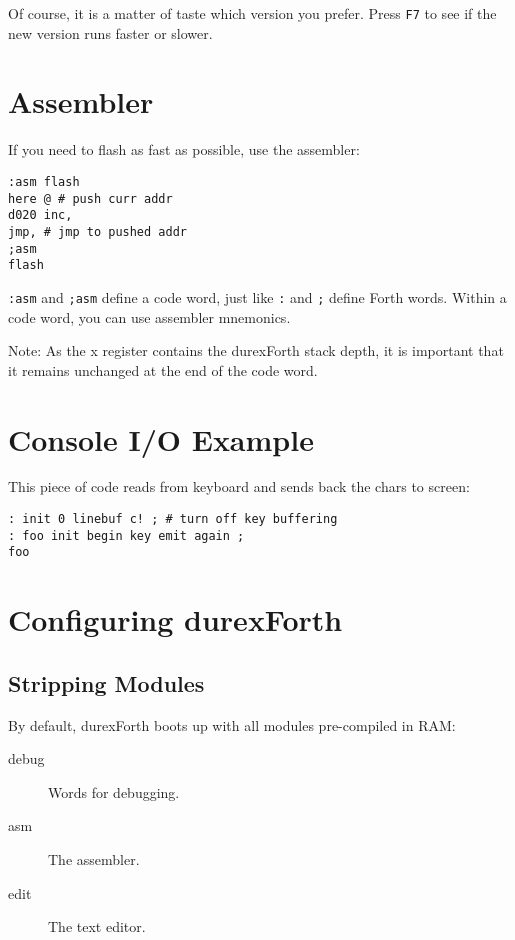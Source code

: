 Of course, it is a matter of taste which version you prefer. Press \texttt{F7} to see if the new version runs faster or slower.

\section{Assembler}

If you need to flash as fast as possible, use the assembler:

\begin{verbatim}
:asm flash
here @ # push curr addr
d020 inc,
jmp, # jmp to pushed addr
;asm
flash
\end{verbatim}

\texttt{:asm} and \texttt{;asm} define a code word, just like \texttt{:} and \texttt{;} define Forth words. Within a code word, you can use assembler mnemonics. 

Note: As the x register contains the durexForth stack depth, it is important that it remains unchanged at the end of the code word.

\section{Console I/O Example}

This piece of code reads from keyboard and sends back the chars to screen:

\begin{verbatim}
: init 0 linebuf c! ; # turn off key buffering
: foo init begin key emit again ;
foo
\end{verbatim}

\section{Configuring durexForth}

\subsection{Stripping Modules}

By default, durexForth boots up with all modules pre-compiled in RAM:

\begin{description}
\item[debug] Words for debugging.
\item[asm] The assembler.
\item[edit] The text editor.
\end{description}

